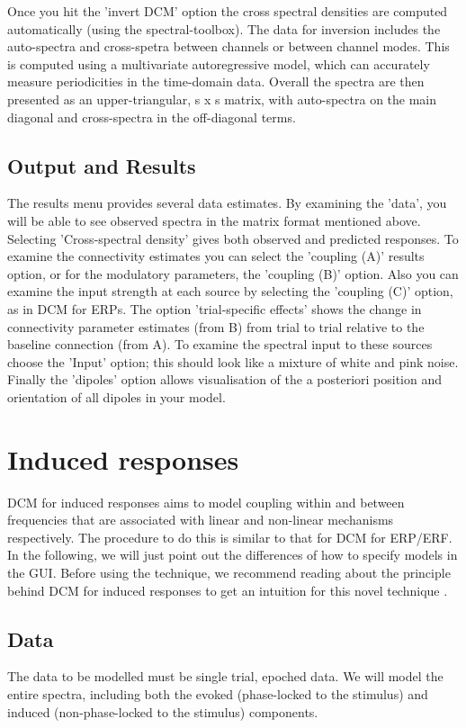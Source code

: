 Once you hit the 'invert DCM' option the cross spectral densities are computed automatically (using the spectral-toolbox). The data for inversion includes the auto-spectra and cross-spetra between channels or between channel modes. This is computed using a multivariate autoregressive model, which can accurately measure periodicities in the time-domain data. Overall the spectra are then presented as an upper-triangular, s x s matrix, with auto-spectra on the main diagonal and cross-spectra in the off-diagonal terms.

\subsection{Output and Results}
The results menu provides several data estimates. By examining the 'data', you will be able to see observed spectra in the matrix format mentioned above. Selecting 'Cross-spectral density' gives both observed and predicted responses. To examine the connectivity estimates you can select the 'coupling (A)' results option, or for the modulatory parameters, the 'coupling (B)' option. Also you can examine the input strength at each source by selecting the 'coupling (C)' option, as in DCM for ERPs. The option 'trial-specific effects' shows the change in connectivity parameter estimates (from B) from trial to trial relative to the baseline connection (from A). To examine the spectral input to these sources choose the 'Input' option; this should look like a mixture of white and pink noise. Finally the 'dipoles' option allows visualisation of the a posteriori position and orientation of all dipoles in your model. 


\section{Induced responses}
DCM for induced responses aims to model coupling within and between frequencies that are associated with linear and non-linear mechanisms respectively. The procedure to do this is similar to that for DCM for ERP/ERF. In the following, we will just point out the differences of how to specify models in the GUI. Before using the technique, we recommend reading about the principle behind DCM for induced responses to get an intuition for this novel technique \cite{cc_induced}.

\subsection{Data}
The data to be modelled must be single trial, epoched data. We will model the entire spectra, including both the evoked (phase-locked to the stimulus) and induced (non-phase-locked to the stimulus) components. 

